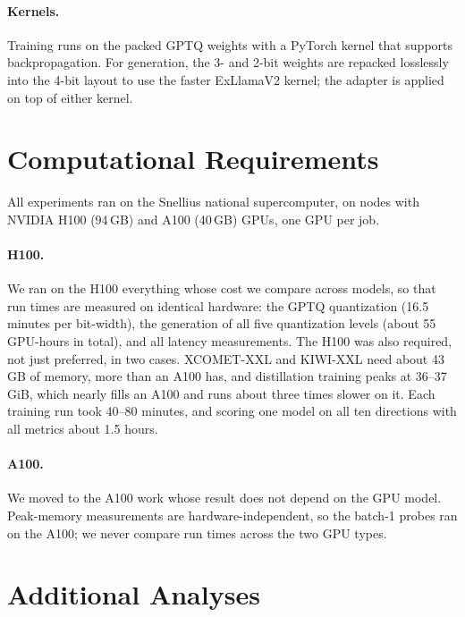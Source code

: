 \documentclass[10pt]{article}
\begin{document}
\paragraph{Kernels.} Training runs on the packed GPTQ weights with a PyTorch
kernel that supports backpropagation. For generation, the 3- and 2-bit weights
are repacked losslessly into the 4-bit layout to use the faster ExLlamaV2
kernel; the adapter is applied on top of either kernel.

\section{Computational Requirements}
\label{app:compute}

All experiments ran on the Snellius national supercomputer, on nodes with
NVIDIA H100 (94\,GB) and A100 (40\,GB) GPUs, one GPU per job.

\paragraph{H100.} We ran on the H100 everything whose cost we compare across
models, so that run times are measured on identical hardware: the GPTQ
quantization (16.5 minutes per bit-width), the generation of all five
quantization levels (about 55 GPU-hours in total), and all latency
measurements. The H100 was also required, not just preferred, in two cases.
XCOMET-XXL and KIWI-XXL need about 43\,GB of memory, more than an A100 has, and
distillation training peaks at 36--37\,GiB, which nearly fills an A100 and runs
about three times slower on it. Each training run took 40--80 minutes, and
scoring one model on all ten directions with all metrics about 1.5 hours.

\paragraph{A100.} We moved to the A100 work whose result does not depend on the
GPU model. Peak-memory measurements are hardware-independent, so the batch-1
probes ran on the A100; we never compare run times across the two GPU types.

\section{Additional Analyses}
\label{app:analyses}
\end{document}
